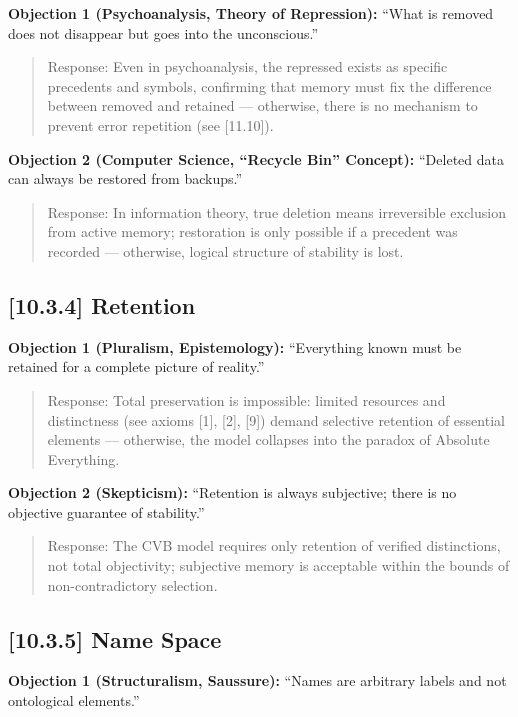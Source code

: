 \documentclass[12pt]{article}
\begin{document}
\textbf{Objection 1 (Psychoanalysis, Theory of Repression):} ``What is removed does not disappear but goes into the unconscious.''

\begin{quote}
Response: Even in psychoanalysis, the repressed exists as specific precedents and symbols, confirming that memory must fix the difference between removed and retained — otherwise, there is no mechanism to prevent error repetition (see [11.10]).
\end{quote}

\textbf{Objection 2 (Computer Science, ``Recycle Bin'' Concept):} ``Deleted data can always be restored from backups.''

\begin{quote}
Response: In information theory, true deletion means irreversible exclusion from active memory; restoration is only possible if a precedent was recorded — otherwise, logical structure of stability is lost.
\end{quote}

\bigskip
\subsection*{[10.3.4] Retention}

\textbf{Objection 1 (Pluralism, Epistemology):} ``Everything known must be retained for a complete picture of reality.''

\begin{quote}
Response: Total preservation is impossible: limited resources and distinctness (see axioms [1], [2], [9]) demand selective retention of essential elements — otherwise, the model collapses into the paradox of Absolute Everything.
\end{quote}

\textbf{Objection 2 (Skepticism):} ``Retention is always subjective; there is no objective guarantee of stability.''

\begin{quote}
Response: The CVB model requires only retention of verified distinctions, not total objectivity; subjective memory is acceptable within the bounds of non-contradictory selection.
\end{quote}

\bigskip
\subsection*{[10.3.5] Name Space}

\textbf{Objection 1 (Structuralism, Saussure):} ``Names are arbitrary labels and not ontological elements.''
\end{document}
